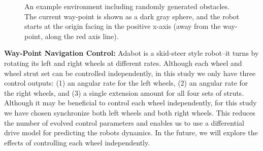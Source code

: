 \begin{figure}[!ht]
    \centering



    \caption{An example environment including randomly generated obstacles. The current way-point is shown as a dark gray sphere, and the robot starts at the origin facing in the positive x-axis (away from the way-point, along the red axis line).}
    \label{fig:simulation-environment}


\end{figure}

\noindent
\textbf{Way-Point Navigation Control:}
%
Adabot is a skid-steer style robot--it turns by rotating its left and right wheels at different rates. Although each wheel and wheel strut set can be controlled independently, in this study we only have three control outputs: (1) an angular rate for the left wheels, (2) an angular rate for the right wheels, and (3) a single extension amount for all four sets of struts.
%
Although it may be beneficial to control each wheel independently, for this study we have chosen synchronize both left wheels and both right wheels.
%
This reduces the number of evolved control parameters and enables us to use  a differential drive model for predicting the robots dynamics. In the future, we will explore the effects of controlling each wheel independently.


